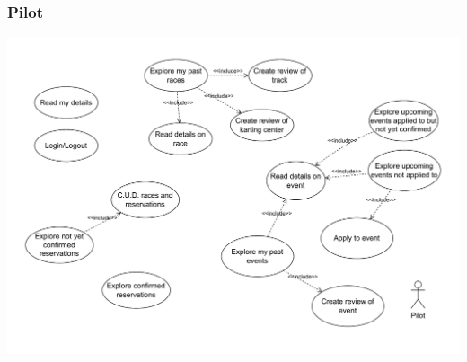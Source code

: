 \documentclass{beamer}
\begin{document}

\begin{frame}
    \frametitle{Pilot}
    \centering
    \includegraphics[width=0.9\linewidth]{drawio/pilot.pdf}
\end{frame}

\end{document}
